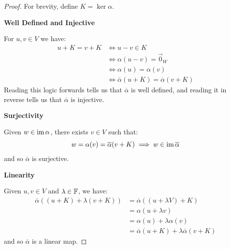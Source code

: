 \documentclass[../main.tex]{subfiles}
\begin{document}
\begin{proof}
  For brevity, define $K = \ker \alpha$.

  \textbf{Well Defined and Injective}\par
  For $u, v \in V$ we have:
  \begin{align*}
    u + K = v + K &\iff u - v \in K \\
                  &\iff \alpha(u - v) = \vec{0}_{W} \\
                  &\iff \alpha(u) = \alpha(v) \\
                  &\iff \overline{\alpha}(u + K) = \overline{\alpha}(v + K)
  \end{align*}
  Reading this logic forwards tells us that $\overline{\alpha}$ is well defined, and reading it in reverse tells us that $\overline{\alpha}$ is injective.

  \textbf{Surjectivity}\par
  Given $w \in \operatorname{im} \alpha$, there exists $v \in V$ such that:
  \[
    w = \alpha(v) = \overline{\alpha}(v + K) \implies w \in \operatorname{im} \overline{\alpha}
  \]
  and so $\overline{\alpha}$ is surjective.

  \textbf{Linearity}\par
  Given $u, v \in V$ and $\lambda \in \mathbb{F}$, we have:
  \begin{align*}
    \overline{\alpha}((u + K) + \lambda (v + K)) &= \overline{\alpha}((u + \lambda V) + K) \\
                                                 &= \alpha(u + \lambda v) \\
                                                 &= \alpha(u) + \lambda \alpha(v) \\
                                                 &= \overline{\alpha}(u + K) + \lambda \overline{\alpha}(v + K)
  \end{align*}
  and so $\overline{\alpha}$ is a linear map.
\end{proof}
\end{document}
